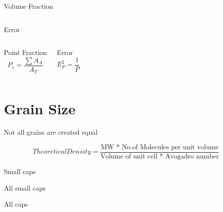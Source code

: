\documentclass[10pt]{beamer}
\begin{document}
{\begin{frame}[fragile]{Volume Fraction}
\begin{columns}[T,onlytextwidth]
\begin{block}{Error}
\end{block}

\end{columns}

  \begin{columns}[T,onlytextwidth]
\begin{block}{Point Fraction}
\begin{equation*}
P_{v} = \dfrac{\sum A_{A}}{A_{T}}
\end{equation*} 
\end{block}
 

\begin{block}{Error}
\begin{equation*}
E_{P}^{2} = \dfrac{1}{P}
\end{equation*} 
\end{block}

\end{columns}


 
    
\end{frame}
}
\section{Grain Size}

{%
\begin{frame}[fragile]{Not all grains are created equal}

\begin{equation*}
Theoretical Density = \dfrac{\text{MW * No.of Molecules per unit volume}}{\text{Volume of unit cell * Avogadro number}}
\end{equation*}   
    
\end{frame}
}


{
\begin{frame}{Small caps}

\end{frame}
}

{
\begin{frame}{All small caps}

\end{frame}
}
{
\begin{frame}{All caps}

\end{frame}
}
\end{document}
